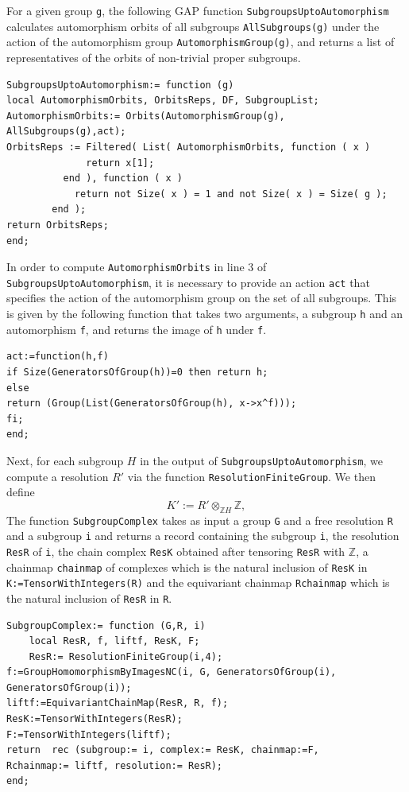\documentclass[a4paper, 10pt]{book}
\theoremstyle{definition}
\numberwithin{equation}{chapter}
\newcommand\lstl{\lstinline}
\newcommand\ZZ{\mathbb Z}
\begin{document}
For a given group \lstinline{g}, the following GAP function \lstl{SubgroupsUptoAutomorphism} calculates automorphism orbits of all subgroups \lstinline{AllSubgroups(g)} under the action of the automorphism group \lstinline{AutomorphismGroup(g)}, and returns a list of representatives of the orbits of non-trivial proper subgroups. \begin{lstlisting}
SubgroupsUptoAutomorphism:= function (g)
local AutomorphismOrbits, OrbitsReps, DF, SubgroupList;
AutomorphismOrbits:= Orbits(AutomorphismGroup(g), AllSubgroups(g),act);
OrbitsReps := Filtered( List( AutomorphismOrbits, function ( x )
              return x[1];
          end ), function ( x )
            return not Size( x ) = 1 and not Size( x ) = Size( g );
        end );
return OrbitsReps;
end;

\end{lstlisting}
In order to compute \lstinline{AutomorphismOrbits} in line 3 of \lstinline{SubgroupsUptoAutomorphism}, it is necessary to provide an action \lstinline{act} that specifies the action of the automorphism group on the set of all subgroups. This is given by the following function that takes two arguments, a subgroup \lstinline{h} and an automorphism \lstinline{f}, and returns the image of \lstinline{h} under \lstinline{f}.
\begin{lstlisting}
act:=function(h,f) 
if Size(GeneratorsOfGroup(h))=0 then return h;
else
return (Group(List(GeneratorsOfGroup(h), x->x^f)));
fi;
end;

\end{lstlisting}
Next, for each subgroup $H$ in the output of \lstinline{SubgroupsUptoAutomorphism}, we compute a resolution $R'$ via the function \lstinline{ResolutionFiniteGroup}. We then define \begin{equation}
	K':=R'\otimes_{\ZZ H} \ZZ,
\end{equation} The function \lstinline{SubgroupComplex} takes as input a group \lstinline{G} and a free resolution \lstinline{R} and a subgroup \lstl{i} and returns a record containing the subgroup \lstinline{i}, the resolution \lstinline{ResR} of \lstl{i}, the chain complex \lstinline{ResK} obtained after tensoring \lstl{ResR} with $\ZZ$, a chainmap \lstl{chainmap} of complexes which is the natural inclusion of \lstinline{ResK} in \lstinline{K:=TensorWithIntegers(R)} and the equivariant chainmap \lstl{Rchainmap} which is the natural inclusion of \lstl{ResR} in \lstl{R}.


\begin{lstlisting}
SubgroupComplex:= function (G,R, i)
    local ResR, f, liftf, ResK, F;
    ResR:= ResolutionFiniteGroup(i,4);
f:=GroupHomomorphismByImagesNC(i, G, GeneratorsOfGroup(i), 
GeneratorsOfGroup(i));
liftf:=EquivariantChainMap(ResR, R, f);
ResK:=TensorWithIntegers(ResR);
F:=TensorWithIntegers(liftf);
return  rec (subgroup:= i, complex:= ResK, chainmap:=F, 
Rchainmap:= liftf, resolution:= ResR);
end;
\end{lstlisting}
\end{document}

